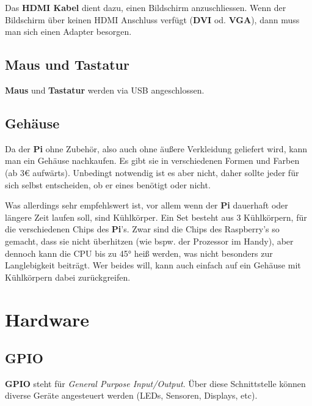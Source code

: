 \documentclass[12pt,a4paper]{article}
\begin{document}
Das \textbf{HDMI Kabel} dient dazu, einen Bildschirm anzuschliessen. Wenn der Bildschirm über keinen HDMI Anschluss verfügt (\textbf{DVI} od. \textbf{VGA}), dann muss man sich einen Adapter besorgen.

\subsection{Maus und Tastatur}

\textbf{Maus} und \textbf{Tastatur} werden via USB angeschlossen.

\subsection{Gehäuse}

Da der \textbf{Pi} ohne Zubehör, also auch ohne äußere Verkleidung geliefert wird, kann man ein Gehäuse nachkaufen. Es gibt sie in verschiedenen Formen und Farben (ab 3€ aufwärts). Unbedingt notwendig ist es aber nicht, daher sollte jeder für sich selbst entscheiden, ob er eines benötigt oder nicht.

Was allerdings sehr empfehlswert ist, vor allem wenn der \textbf{Pi} dauerhaft oder längere Zeit laufen soll, sind Kühlkörper. Ein Set besteht aus 3 Kühlkörpern, für die verschiedenen Chips des \textbf{Pi}'s. Zwar sind die Chips des Raspberry’s so gemacht, dass sie nicht überhitzen (wie bspw. der Prozessor im Handy), aber dennoch kann die CPU bis zu 45° heiß werden, was nicht besonders zur Langlebigkeit beiträgt. Wer beides will, kann auch einfach auf ein Gehäuse mit Kühlkörpern dabei zurückgreifen.

\section{Hardware}

\subsection{GPIO}

\textbf{GPIO} steht für \textit{General Purpose Input/Output}. Über diese Schnittstelle können diverse Geräte angesteuert werden (LEDs, Sensoren, Displays, etc).
\end{document}
